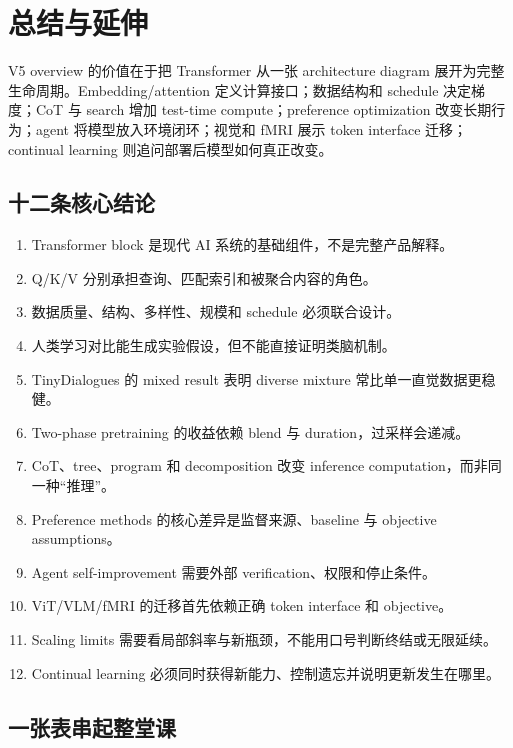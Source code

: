 \section{总结与延伸}

V5 overview 的价值在于把 Transformer 从一张 architecture diagram 展开为完整生命周期。Embedding/attention 定义计算接口；数据结构和 schedule 决定梯度；CoT 与 search 增加 test-time compute；preference optimization 改变长期行为；agent 将模型放入环境闭环；视觉和 fMRI 展示 token interface 迁移；continual learning 则追问部署后模型如何真正改变。

\subsection{十二条核心结论}

\begin{enumerate}
  \item Transformer block 是现代 AI 系统的基础组件，不是完整产品解释。
  \item Q/K/V 分别承担查询、匹配索引和被聚合内容的角色。
  \item 数据质量、结构、多样性、规模和 schedule 必须联合设计。
  \item 人类学习对比能生成实验假设，但不能直接证明类脑机制。
  \item TinyDialogues 的 mixed result 表明 diverse mixture 常比单一直觉数据更稳健。
  \item Two-phase pretraining 的收益依赖 blend 与 duration，过采样会递减。
  \item CoT、tree、program 和 decomposition 改变 inference computation，而非同一种“推理”。
  \item Preference methods 的核心差异是监督来源、baseline 与 objective assumptions。
  \item Agent self-improvement 需要外部 verification、权限和停止条件。
  \item ViT/VLM/fMRI 的迁移首先依赖正确 token interface 和 objective。
  \item Scaling limits 需要看局部斜率与新瓶颈，不能用口号判断终结或无限延续。
  \item Continual learning 必须同时获得新能力、控制遗忘并说明更新发生在哪里。
\end{enumerate}

\subsection{一张表串起整堂课}

